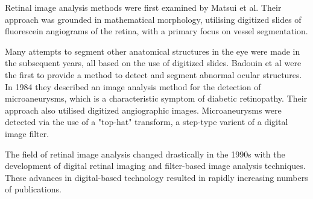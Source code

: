 Retinal image analysis methods were first examined by Matsui et al.  Their approach was grounded in mathematical morphology, utilising digitized slides of fluorescein angiograms of the retina, with a primary focus on vessel segmentation.\cite{matsui1973study}  

Many attempts to segment other anatomical structures in the eye were made in the subsequent years, all based on the use of digitized slides.  Badouin et al were the first to provide a method to detect and segment abnormal ocular structures.  In 1984 they described an image analysis method for the detection of microaneurysms, which is a characteristic symptom of diabetic retinopathy.\cite{baudoin1983automatic}  Their approach also utilised digitized angiographic images.  Microaneurysms were detected via the use of a "top-hat" transform, a step-type varient of a digital image filter.\cite{sonka1998image}  

The field of retinal image analysis changed drastically in the 1990s with the development of digital retinal imaging and filter-based image analysis techniques.  These advances in digital-based technology resulted in rapidly increasing numbers of publications.